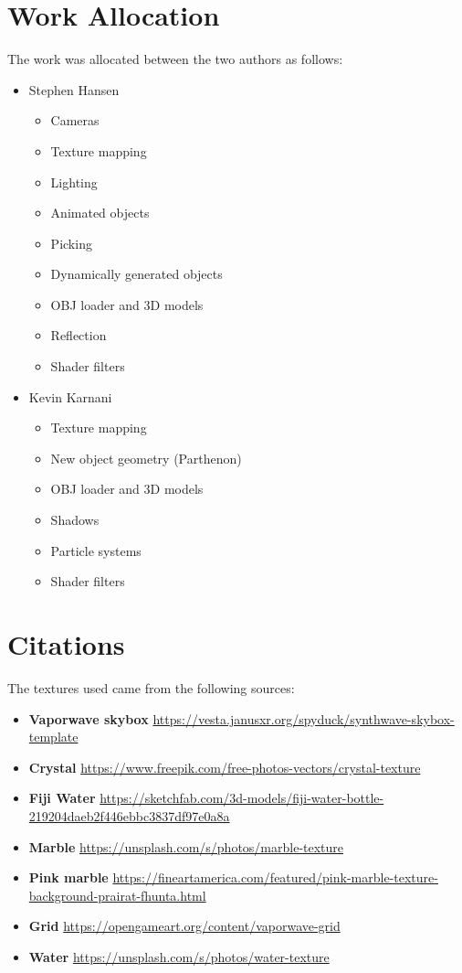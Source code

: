 \documentclass[10pt,letterpaper,oneside]{article}
\numberwithin{equation}{section}		%
\numberwithin{figure}{section}			%
\numberwithin{table}{section}				%
\begin{document}
\newpage
\section{Work Allocation}

The work was allocated between the two authors as follows:
\begin{itemize}
    \item Stephen Hansen
    \begin{itemize}
        \item Cameras
        \item Texture mapping
        \item Lighting
        \item Animated objects
        \item Picking
        \item Dynamically generated objects
        \item OBJ loader and 3D models
        \item Reflection
        \item Shader filters
    \end{itemize}
    \item Kevin Karnani
    \begin{itemize}
        \item Texture mapping
        \item New object geometry (Parthenon)
        \item OBJ loader and 3D models
        \item Shadows
        \item Particle systems
        \item Shader filters
    \end{itemize}
\end{itemize}

\newpage
\section{Citations}

The textures used came from the following sources:
\begin{itemize}
\item \textbf{Vaporwave skybox} \url{https://vesta.janusxr.org/spyduck/synthwave-skybox-template}
\item \textbf{Crystal} \url{https://www.freepik.com/free-photos-vectors/crystal-texture}
\item \textbf{Fiji Water} \url{https://sketchfab.com/3d-models/fiji-water-bottle-219204daeb2f446ebbc3837df97e0a8a}
\item \textbf{Marble} \url{https://unsplash.com/s/photos/marble-texture}
\item \textbf{Pink marble} \url{https://fineartamerica.com/featured/pink-marble-texture-background-prairat-fhunta.html}
\item \textbf{Grid} \url{https://opengameart.org/content/vaporwave-grid}
\item \textbf{Water} \url{https://unsplash.com/s/photos/water-texture}
\end{itemize}
\end{document}
